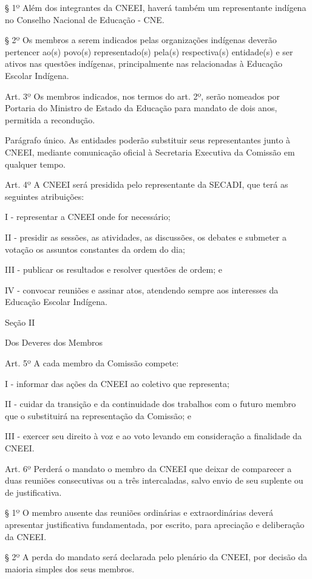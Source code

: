 \documentclass[
]{book}
\begin{document}
§ 1º Além dos integrantes da CNEEI, haverá também um representante indígena no Conselho Nacional de Educação - CNE.

§ 2º Os membros a serem indicados pelas organizações indígenas deverão pertencer ao(s) povo(s) representado(s) pela(s) respectiva(s) entidade(s) e ser ativos nas questões indígenas, principalmente nas relacionadas à Educação Escolar Indígena.

Art. 3º Os membros indicados, nos termos do art. 2º, serão nomeados por Portaria do Ministro de Estado da Educação para mandato de dois anos, permitida a recondução.

Parágrafo único. As entidades poderão substituir seus representantes junto à CNEEI, mediante comunicação oficial à Secretaria Executiva da Comissão em qualquer tempo.

Art. 4º A CNEEI será presidida pelo representante da SECADI, que terá as seguintes atribuições:

I - representar a CNEEI onde for necessário;

II - presidir as sessões, as atividades, as discussões, os debates e submeter a votação os assuntos constantes da ordem do dia;

III - publicar os resultados e resolver questões de ordem; e

IV - convocar reuniões e assinar atos, atendendo sempre aos interesses da Educação Escolar Indígena.

Seção II

Dos Deveres dos Membros

Art. 5º A cada membro da Comissão compete:

I - informar das ações da CNEEI ao coletivo que representa;

II - cuidar da transição e da continuidade dos trabalhos com o futuro membro que o substituirá na representação da Comissão; e

III - exercer seu direito à voz e ao voto levando em consideração a finalidade da CNEEI.

Art. 6º Perderá o mandato o membro da CNEEI que deixar de comparecer a duas reuniões consecutivas ou a três intercaladas, salvo envio de seu suplente ou de justificativa.

§ 1º O membro ausente das reuniões ordinárias e extraordinárias deverá apresentar justificativa fundamentada, por escrito, para apreciação e deliberação da CNEEI.

§ 2º A perda do mandato será declarada pelo plenário da CNEEI, por decisão da maioria simples dos seus membros.
\end{document}
